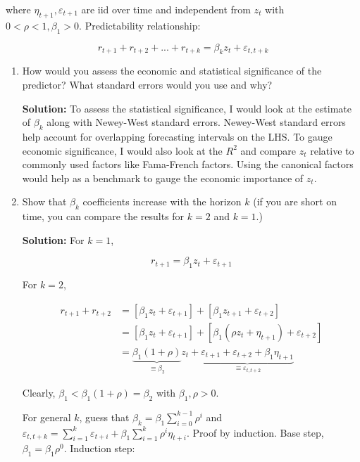 \documentclass{article}
\begin{document}
where $\eta_{t+1}, \varepsilon_{t+1}$ are iid over time and independent from $z_t$ with $0 < \rho < 1, \beta_1 > 0$. Predictability relationship:

$$
r_{t+1} + r_{t+2} + ... + r_{t+k} = \beta_k z_t + \varepsilon_{t,t+k}
$$

\begin{enumerate}

\item How would you assess the economic and statistical significance of the predictor? What standard errors would you use and why?

\textbf{Solution:} To assess the statistical significance, I would look at the estimate of $\beta_k$ along with Newey-West standard errors. Newey-West standard errors help account for overlapping forecasting intervals on the LHS.  To gauge economic significance, I would also look at the $R^2$ and compare $z_t$ relative to commonly used factors like Fama-French factors.  Using the canonical factors would help as a benchmark to gauge the economic importance of $z_t$.

\item Show that $\beta_k$ coefficients increase with the horizon $k$ (if you are short on time, you can
compare the results for $k = 2$ and $k = 1$.)

\textbf{Solution:} For $k=1$,

$$
r_{t+1} = \beta_1 z_t + \varepsilon_{t+1}
$$

For $k=2$,

\begin{align*}
r_{t+1} + r_{t+2} 
&= [\beta_1 z_t + \varepsilon_{t+1}] + [\beta_1 z_{t+1} + \varepsilon_{t+2}]\\
&= [\beta_1 z_t + \varepsilon_{t+1}] + [\beta_1 (\rho z_{t} + \eta_{t+1}) + \varepsilon_{t+2}]\\
&= \underbrace{\beta_1 (1 +\rho)}_{\equiv \beta_2} z_t + \underbrace{\varepsilon_{t+1}+ \varepsilon_{t+2} + \beta_1 \eta_{t+1}}_{\equiv \varepsilon_{t,t+2}}
\end{align*}

Clearly, $\beta_1 < \beta_1 (1 +\rho) = \beta_2$ with $\beta_1, \rho > 0$.

\bigskip

For general $k$, guess that $\beta_k = \beta_1 \sum_{i=0}^{k-1} \rho^i$ and $\varepsilon_{t,t+k} = \sum_{i=1}^k \varepsilon_{t+i} + \beta_1 \sum_{i=1}^k \rho^i \eta_{t+i}$. Proof by induction. Base step, $\beta_1 = \beta_1 \rho^0$. Induction step:


\end{enumerate}
\end{document}
